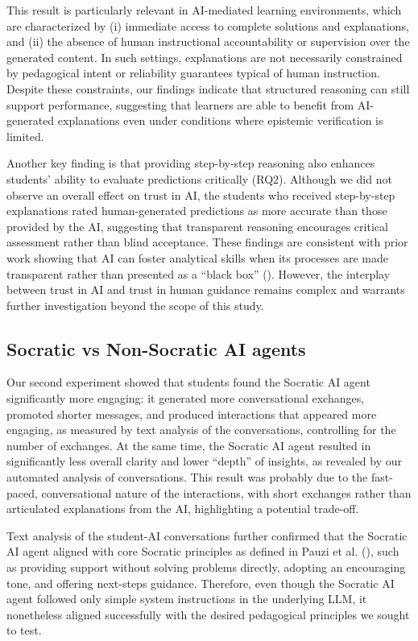 \documentclass[
  12pt,
]{article}
\begin{document}
This result is particularly relevant in AI-mediated learning environments, which are characterized by (i) immediate access to complete solutions and explanations, and (ii) the absence of human instructional accountability or supervision over the generated content. In such settings, explanations are not necessarily constrained by pedagogical intent or reliability guarantees typical of human instruction. Despite these constraints, our findings indicate that structured reasoning can still support performance, suggesting that learners are able to benefit from AI-generated explanations even under conditions where epistemic verification is limited.

Another key finding is that providing step-by-step reasoning also enhances students' ability to evaluate predictions critically (RQ2). Although we did not observe an overall effect on trust in AI, the students who received step-by-step explanations rated human-generated predictions as more accurate than those provided by the AI, suggesting that transparent reasoning encourages critical assessment rather than blind acceptance. These findings are consistent with prior work showing that AI can foster analytical skills when its processes are made transparent rather than presented as a ``black box'' (). However, the interplay between trust in AI and trust in human guidance remains complex and warrants further investigation beyond the scope of this study.

\subsection{Socratic vs Non-Socratic AI agents}\label{socratic-vs-non-socratic-ai-agents}

Our second experiment showed that students found the Socratic AI agent significantly more engaging: it generated more conversational exchanges, promoted shorter messages, and produced interactions that appeared more engaging, as measured by text analysis of the conversations, controlling for the number of exchanges. At the same time, the Socratic AI agent resulted in significantly less overall clarity and lower ``depth'' of insights, as revealed by our automated analysis of conversations. This result was probably due to the fast-paced, conversational nature of the interactions, with short exchanges rather than articulated explanations from the AI, highlighting a potential trade-off.

Text analysis of the student-AI conversations further confirmed that the Socratic AI agent aligned with core Socratic principles as defined in Pauzi et al. (), such as providing support without solving problems directly, adopting an encouraging tone, and offering next-steps guidance. Therefore, even though the Socratic AI agent followed only simple system instructions in the underlying LLM, it nonetheless aligned successfully with the desired pedagogical principles we sought to test.
\end{document}
